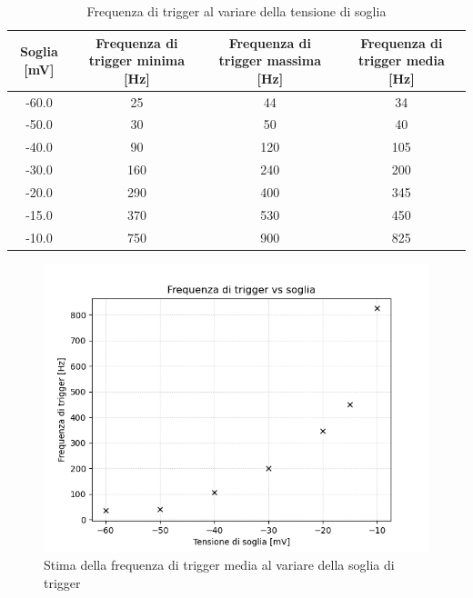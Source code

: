\documentclass{article}
\begin{document}
\begin{table}[h!]
    \centering
    \begin{tabular}{|c|c|c|c|}
        \hline
        Soglia [mV] & Frequenza di trigger minima [Hz]& Frequenza di trigger massima [Hz] & Frequenza di trigger media [Hz]\\
        \hline
            -60.0& 25& 44& 34\\
            -50.0& 30& 50& 40\\
            -40.0& 90& 120& 105 \\
            -30.0& 160& 240& 200\\
            -20.0& 290& 400& 345\\
            -15.0& 370& 530& 450\\
            -10.0& 750& 900& 825\\
        \hline
    \end{tabular}
    \caption{Frequenza di trigger al variare della tensione di soglia} \label{tabfreq}
\end{table}

\vspace{4mm}
\begin{figure}[h]
\begin{center}
\includegraphics[scale=0.9]{Grafici/ftrigger_vs_soglia.png}
\caption{Stima della frequenza di trigger media al variare della soglia di trigger} \label{f1}
\end{center}
\end{figure}

\newpage
\end{document}
